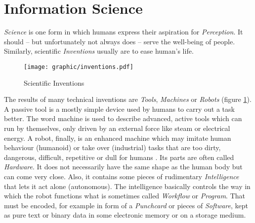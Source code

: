 %
%
%
%
%
%
%

\section{Information Science}
\label{information_science_heading}

\emph{Science} is one form in which humans express their aspiration for
\emph{Perception}. It should -- but unfortunately not always does -- serve the
well-being of people. Similarly, scientific \emph{Inventions} usually are to
ease human's life.

\begin{figure}[ht]
    \begin{center}
        \texttt{[image: graphic/inventions.pdf]}
        \caption{Scientific Inventions}
        \label{inventions_figure}
    \end{center}
\end{figure}

The results of many technical inventions are \emph{Tools}, \emph{Machines} or
\emph{Robots} (figure \ref{inventions_figure}). A passive tool is a mostly
simple device used by humans to carry out a task better. The word machine is
used to describe advanced, active tools which can run by themselves, only
driven by an external force like steam or electrical energy. A robot, finally,
is an enhanced machine which may imitate human behaviour (humanoid) or take
over (industrial) tasks that are too dirty, dangerous, difficult, repetitive or
dull for humans \cite{wikipedia}. Its parts are often called \emph{Hardware}.
It does not necessarily have the same shape as the human body but can come very
close. Also, it contains some pieces of rudimentary \emph{Intelligence} that
lets it act alone (autonomous). The intelligence basically controls the way in
which the robot functions what is sometimes called \emph{Workflow} or
\emph{Program}. That must be encoded, for example in form of a \emph{Punchcard}
or pieces of \emph{Software}, kept as pure text or binary data in some
electronic memory or on a storage medium.

